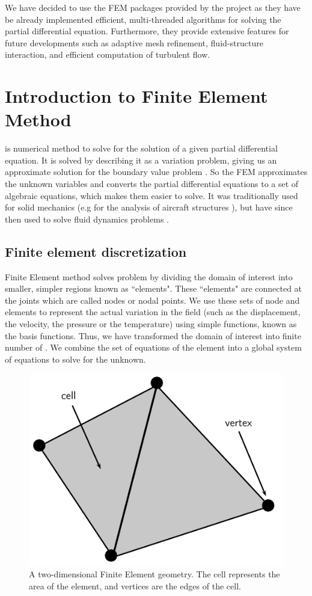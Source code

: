 We have decided to use the FEM packages provided by the \fenics project as they have be already implemented efficient, multi-threaded algorithms for solving the partial differential equation. Furthermore, they provide extensive features for future developments such as adaptive mesh refinement, fluid-structure interaction, and efficient computation of turbulent flow.

\section{Introduction to Finite Element Method}

 is numerical method to solve for the solution of a given partial differential equation. It is solved by describing it as a variation problem, giving us an approximate solution for the boundary value problem \cite{Brenner2002}. So the FEM approximates the unknown variables and converts the partial differential equations to a set of algebraic equations, which makes them easier to solve. It was traditionally used for solid mechanics (e.g for the analysis of aircraft structures \cite{RAO2011}), but have since then used to solve fluid dynamics problems \cite{Guermond2006a} \cite{Johnston2004a} \cite{Guermond2003a}.

\subsection*{Finite element discretization}

Finite Element method solves problem by dividing the domain of interest into smaller, simpler regions known as ``elements". These ``elements" are connected at the joints which are called nodes or nodal points. We use these sets of node and elements to represent the actual variation in the field (such as the displacement, the velocity, the pressure or the temperature) using simple functions, known as the basis functions. Thus, we have transformed the domain of interest into finite number of . We combine the set of equations of the element into a global system of equations to solve for the unknown.

	\begin{figure}[b]
	\centering
	\includegraphics[width=0.4\linewidth]{./figures/eulerian/finiteElementDefinitions.pdf}
	\caption{A two-dimensional Finite Element geometry. The cell represents the area of the element, and vertices are the edges of the cell.}
	\label{fig:finiteElementDefinitions}
	\end{figure}

